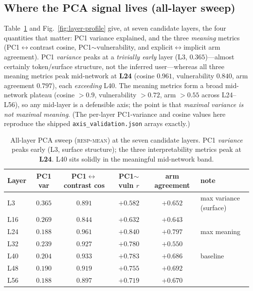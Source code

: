\documentclass{article}
\newcommand{\respmean}{\textsc{resp-mean}}
\begin{document}
\subsection*{Where the PCA signal lives (all-layer sweep)}
Table~\ref{tab:layer-pca} and Fig.~\ref{fig:layer-profile} give, at seven candidate
layers, the four quantities that matter: PC1 variance explained, and the three
\emph{meaning} metrics (PC1$\leftrightarrow$contrast cosine, PC1$\sim$vulnerability,
and explicit$\leftrightarrow$implicit arm agreement). PC1 \emph{variance} peaks at a
\emph{trivially early} layer (L3, $0.365$)---almost certainly token/surface
structure, not the inferred user---whereas all three meaning metrics peak
mid-network at \textbf{L24} (cosine $0.961$, vulnerability $0.840$, arm agreement
$0.797$), each \emph{exceeding} L40. The meaning metrics form a broad mid-network
plateau (cosine $>0.9$, vulnerability $>0.72$, arm $>0.55$ across L24--L56), so any
mid-layer is a defensible axis; the point is that \emph{maximal variance is not
maximal meaning}. (The per-layer PC1-variance and cosine values here reproduce the
shipped \texttt{axis\_validation.json} arrays exactly.)

\begin{table}[h]
\centering\small
\caption{All-layer PCA sweep (\respmean{}) at the seven candidate layers. PC1
\emph{variance} peaks early (L3, surface structure); the three interpretability
metrics peak at \textbf{L24}. L40 sits solidly in the meaningful mid-network band.}
\label{tab:layer-pca}
\begin{tabular}{lccccl}
\toprule
Layer & PC1 var & PC1$\leftrightarrow$contrast cos & PC1$\sim$vuln $r$ & arm agreement & note \\
\midrule
L3  & $\mathbf{0.365}$ & $0.891$ & $+0.582$ & $+0.652$ & max variance (surface) \\
L16 & $0.269$ & $0.844$ & $+0.632$ & $+0.643$ & \\
L24 & $0.188$ & $\mathbf{0.961}$ & $\mathbf{+0.840}$ & $\mathbf{+0.797}$ & max meaning \\
L32 & $0.239$ & $0.927$ & $+0.780$ & $+0.550$ & \\
L40 & $0.204$ & $0.933$ & $+0.783$ & $+0.686$ & baseline \\
L48 & $0.190$ & $0.919$ & $+0.755$ & $+0.692$ & \\
L56 & $0.188$ & $0.897$ & $+0.719$ & $+0.670$ & \\
\bottomrule
\end{tabular}
\end{table}
\end{document}
